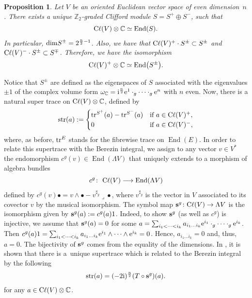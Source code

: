 \documentclass[10pt,a4paper]{amsart}
\numberwithin{equation}{section}
\newtheorem{prop}[thm]{Proposition}
\theoremstyle{definition}
\newcommand{\C}{\mathbb C}
\newcommand{\Cl}{{\rm C}\ell}
\begin{document}
\begin{prop} \label{pro:spinorbundle}
Let $V$ be an oriented Euclidean vector space of even dimension~$n$. There exists a unique $\mathbb{Z}_2$-graded Clifford module $S=S^+\oplus S^-$, such that
	\[\Cl(V)\otimes \C\simeq \operatorname{End}(S).\]
	In particular, ${\rm dim} S^\pm=2^{\frac{n}{2}-1}$. Also, we have that $\Cl(V)^+\cdot S^\pm\subset S^\pm$ and $\Cl(V)^-\cdot S^\pm\subset S^\mp$. Therefore, we have the isomorphism \[\Cl(V)^+\otimes \C\simeq \operatorname{End}\bigl(S^\pm\bigr).\]
\end{prop}
Notice that $S^\pm$ are defined as the eigenspaces of $S$ associated with the eigenvalues $\pm 1$ of the complex volume form $\omega_{\mathbb{C}}={\rm i}^{\frac{n}{2}} {\rm e}^1\cdot_g\dots\cdot_g {\rm e}^n$ with $n$ even. Now, there is a natural super trace on $\Cl(V)\otimes \mathbb{C}$, defined by
\begin{equation*}
	{\rm str}(a) :=
	\begin{cases}
		{\rm tr}^{S^+}(a)-{\rm tr}^{S^-}(a) & \text{if $a\in \Cl(V)^+$,}\\
		0 & \text{if $a \in \Cl(V)^-,$}
	\end{cases}
\end{equation*}
where, as before, ${\rm tr}^E$ stands for the fibrewise trace on $\operatorname{End}(E)$. In order to relate this supertrace with the Berezin integral, we assign to any vector $v\in V^*$ the endomorphism $c^g(v)\in \operatorname{End}(\Lambda V) $ that uniquely extends to a morphism of algebra bundles
\begin{equation}\label{eq:cliffend}
c^g\colon \ \Cl(V) \longrightarrow \operatorname{End}(\Lambda V)
\end{equation}
defined by
$	%
	c^g(v)\bullet =v\wedge\bullet -v^{\sharp_g} \lrcorner\bullet$,
where $v^{\sharp_g}$ is the vector in $V$ associated to its covector $v$ by the musical isomorphism. The symbol map ${\bf s}^g\colon \Cl(V)\to \Lambda V$ is the isomorphism given by ${\bf s}^g(a):=c^g(a)1$. Indeed, to show ${\bf s}^g$ (as well as $c^g$) is injective, we assume that ${\bf s}^g(a)=0$ for some $a=\sum_{i_1<\dots<i_k} a_{i_1\dots i_k} {\rm e}^{i_1}\cdot_g\cdots\cdot_g {\rm e}^{i_k}$. Then $c^g(a)1=\sum_{i_1<\dots<i_k} a_{i_1\dots i_k} {\rm e}^{i_1}\wedge\dots\wedge {\rm e}^{i_k}=0$. Hence, $a_{i_1\dots i_k}=0$ and, thus, $a=0$. The bijectivity of ${\bf s}^g$ comes from the equality of the dimensions. In \cite[Proposition~3.21]{BGV}, it is shown that there is a~unique supertrace which is related to the Berezin integral by the following
\begin{equation}\label{eq:supertraceformula}
	{\rm str}(a)=(-2{\rm i})^{\frac{n}{2}}(T\circ {\bf s}^g)(a).
\end{equation}
for any $a\in \Cl(V)\otimes \mathbb{C}$.
\end{document}
